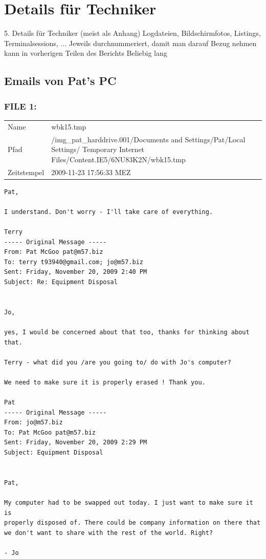 \chapter{Details für Techniker}
\label{sec:details_tec}

5. Details für Techniker (meist als Anhang)
Logdateien, Bildschirmfotos, Listings, Terminalsessions, ...
Jeweils durchnummeriert, damit man darauf Bezug nehmen kann in vorherigen Teilen des Berichts
Beliebig lang

\section{Emails von Pat's PC}
\label{sec:pat_emails}

\subsection{FILE 1:}
\label{sec:pat_emails_1}

\begin{table}[htb]
	\begin{tabular}{p{2cm} p{13.5cm}}
		Name & wbk15.tmp\\
		Pfad & /img_pat_harddrive.001/Documents and Settings/Pat/Local Settings/ Temporary Internet Files/Content.IE5/6NU83K2N/wbk15.tmp\\
		Zeitstempel & 2009-11-23 17:56:33 MEZ
	\end{tabular}
\end{table}	

\begin{lstlisting}
Pat,

I understand. Don't worry - I'll take care of everything.

Terry
----- Original Message ----- 
From: Pat McGoo pat@m57.biz
To: terry t93940@gmail.com; jo@m57.biz
Sent: Friday, November 20, 2009 2:40 PM
Subject: Re: Equipment Disposal


Jo,

yes, I would be concerned about that too, thanks for thinking about 
that.

Terry - what did you /are you going to/ do with Jo's computer?

We need to make sure it is properly erased ! Thank you.

Pat
----- Original Message ----- 
From: jo@m57.biz
To: Pat McGoo pat@m57.biz
Sent: Friday, November 20, 2009 2:29 PM
Subject: Equipment Disposal


Pat,

My computer had to be swapped out today. I just want to make sure it is
properly disposed of. There could be company information on there that 
we don't want to share with the rest of the world. Right?

- Jo
\end{lstlisting}

